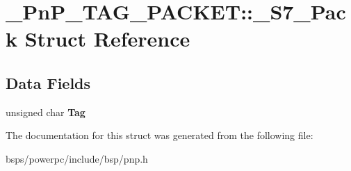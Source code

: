 \hypertarget{struct__PnP__TAG__PACKET_1_1__S7__Pack}{}\section{\+\_\+\+Pn\+P\+\_\+\+T\+A\+G\+\_\+\+P\+A\+C\+K\+ET\+::\+\_\+\+S7\+\_\+\+Pack Struct Reference}
\label{struct__PnP__TAG__PACKET_1_1__S7__Pack}
\subsection*{Data Fields}
\begin{DoxyCompactItemize}
\item 
\mbox{\label{struct__PnP__TAG__PACKET_1_1__S7__Pack_a58b06b377e8f2ecf9c55b7856ded669c}} 
unsigned char {\bfseries Tag}
\end{DoxyCompactItemize}


The documentation for this struct was generated from the following file\+:\begin{DoxyCompactItemize}
\item 
bsps/powerpc/include/bsp/pnp.\+h\end{DoxyCompactItemize}

